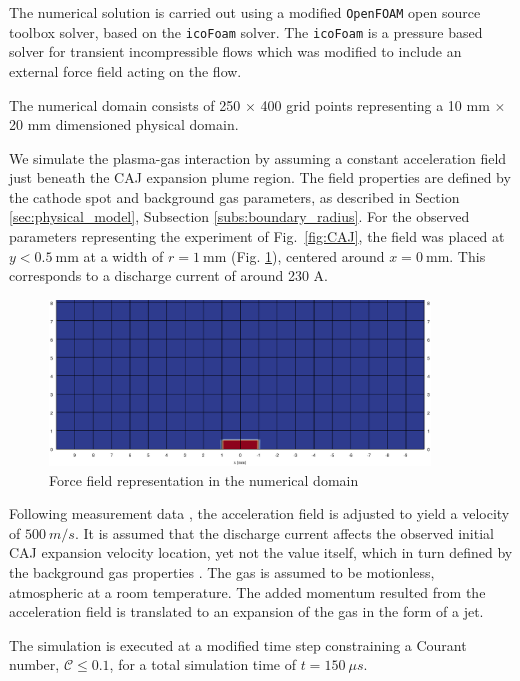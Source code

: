 \documentclass[a4paper]{iacas}%
\begin{document}
The numerical solution is carried out using a modified \texttt{OpenFOAM} \cite{OPENFOAM} open source toolbox solver, based on the \texttt{icoFoam} solver. The \texttt{icoFoam} is a pressure based solver for transient incompressible flows which was modified to include an external force field acting on the flow.

The numerical domain consists of 250 $\times$ 400 grid points representing a 10 mm $\times$ 20 mm dimensioned physical domain. 

We simulate the plasma-gas interaction by assuming a constant acceleration field just beneath the CAJ expansion plume region. The field properties are defined by the cathode spot and background gas parameters, as described in Section \ref{sec:physical_model}, Subsection \ref{subs:boundary_radius}. For the observed parameters representing the experiment \cite{KR} of Fig.~\ref{fig:CAJ}, the field was placed at $ y < 0.5~ \mathrm{mm} $ at a width of $r = 1~\mathrm{mm}$ (Fig. \ref{fig:force_field}), centered around $x=0~\mathrm{mm}$. This corresponds to a discharge current of around 230 A.

\begin{figure}[htbp]
	\centering
	\includegraphics[width=0.9\textwidth]{forceField}
	\caption{Force field representation in the numerical domain}\label{fig:force_field}
\end{figure}

Following measurement data \cite{KRClose}, the acceleration field is adjusted to yield a velocity of $500~ m/s$. It is assumed that the discharge current affects the observed initial CAJ expansion velocity location, yet not the value itself, which in turn defined by the background gas properties \cite{KR,KRClose,KRFar}. The gas is assumed to be motionless, atmospheric at a room temperature. The added momentum resulted from the acceleration field is translated to an expansion of the gas in the form of a jet.

The simulation is executed at a modified time step  constraining a Courant number, $\mathcal{C} \leq 0.1$, for a total simulation time of $t = 150~\mu s$.
\end{document}
